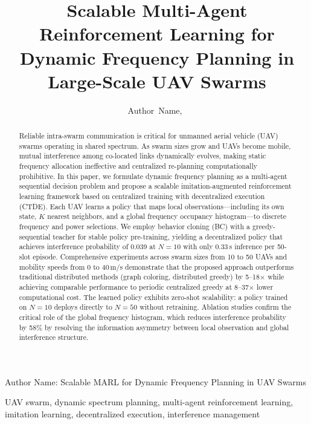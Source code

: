\documentclass[journal]{IEEEtran}
\begin{document}
\title{Scalable Multi-Agent Reinforcement Learning for Dynamic Frequency Planning in Large-Scale UAV Swarms}

\author{Author~Name,~}
%
{Author Name: Scalable MARL for Dynamic Frequency Planning in UAV Swarms}

\maketitle

\begin{abstract}
Reliable intra-swarm communication is critical for unmanned aerial vehicle (UAV) swarms operating in shared spectrum. As swarm sizes grow and UAVs become mobile, mutual interference among co-located links dynamically evolves, making static frequency allocation ineffective and centralized re-planning computationally prohibitive. In this paper, we formulate dynamic frequency planning as a multi-agent sequential decision problem and propose a scalable imitation-augmented reinforcement learning framework based on centralized training with decentralized execution (CTDE). Each UAV learns a policy that maps local observations---including its own state, $K$ nearest neighbors, and a global frequency occupancy histogram---to discrete frequency and power selections. We employ behavior cloning (BC) with a greedy-sequential teacher for stable policy pre-training, yielding a decentralized policy that achieves interference probability of 0.039 at $N=10$ with only 0.33\,s inference per 50-slot episode. Comprehensive experiments across swarm sizes from 10 to 50 UAVs and mobility speeds from 0 to 40\,m/s demonstrate that the proposed approach outperforms traditional distributed methods (graph coloring, distributed greedy) by 5--18$\times$ while achieving comparable performance to periodic centralized greedy at 8--37$\times$ lower computational cost. The learned policy exhibits zero-shot scalability: a policy trained on $N=10$ deploys directly to $N=50$ without retraining. Ablation studies confirm the critical role of the global frequency histogram, which reduces interference probability by 58\% by resolving the information asymmetry between local observation and global interference structure.
\end{abstract}

\begin{IEEEkeywords}
UAV swarm, dynamic spectrum planning, multi-agent reinforcement learning, imitation learning, decentralized execution, interference management
\end{IEEEkeywords}
\end{document}
